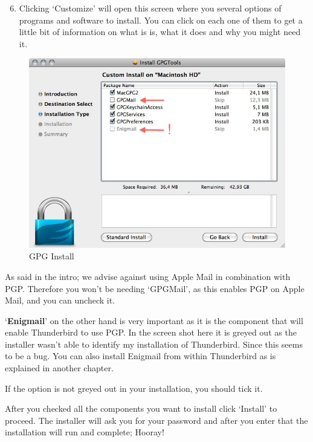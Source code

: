 \begin{enumerate}[1.]
\setcounter{enumi}{5}
\item
  Clicking `Customize' will open this screen where you several options
  of programs and software to install. You can click on each one of them
  to get a little bit of information on what is is, what it does and why
  you might need it.
\end{enumerate}
\begin{figure}[htbp]
\centering
\includegraphics{gpg_mac_inst_7.jpg}
\caption{GPG Install}
\end{figure}

As said in the intro; we advise against using Apple Mail in combination
with PGP. Therefore you won't be needing `GPGMail', as this enables PGP
on Apple Mail, and you can uncheck it.

`\textbf{Enigmail}' on the other hand is very important as it is the
component that will enable Thunderbird to use PGP. In the screen shot
here it is greyed out as the installer wasn't able to identify my
installation of Thunderbird. Since this seems to be a bug. You can also
install Enigmail from within Thunderbird as is explained in another
chapter.

If the option is not greyed out in your installation, you should tick
it.

After you checked all the components you want to install click `Install'
to proceed. The installer will ask you for your password and after you
enter that the installation will run and complete; Hooray!

